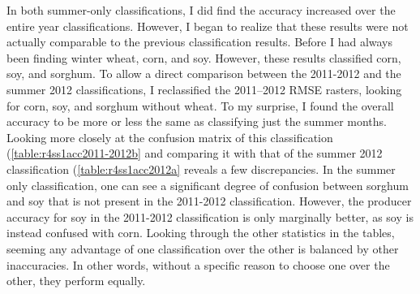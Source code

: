 In both summer-only classifications, I did find the accuracy increased over the entire year classifications. However, I began to realize that these results were not actually comparable to the previous classification results. Before I had always been finding winter wheat, corn, and soy. However, these results classified corn, soy, and sorghum. To allow a direct comparison between the 2011-2012 and the summer 2012 classifications, I reclassified the 2011--2012 RMSE rasters, looking for corn, soy, and sorghum without wheat. To my surprise, I found the overall accuracy to be more or less the same as classifying just the summer months. Looking more closely at the confusion matrix of this classification (\cref{table:r4ss1acc2011-2012b} and comparing it with that of the summer 2012 classification (\cref{table:r4ss1acc2012a} reveals a few discrepancies. In the summer only classification, one can see a significant degree of confusion between sorghum and soy that is not present in the 2011-2012 classification. However, the producer accuracy for soy in the 2011-2012 classification is only marginally better, as soy is instead confused with corn. Looking through the other statistics in the tables, seeming any advantage of one classification over the other is balanced by other inaccuracies. In other words, without a specific reason to choose one over the other, they perform equally.


